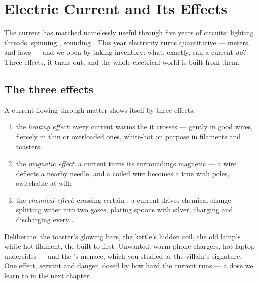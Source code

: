 \chapter{Electric Current and Its Effects}\label{ch:g8:electric-current-effects}

The current has marched namelessly useful through five years of
circuits: lighting threads, spinning , sounding .
This year electricity turns quantitative --- meters,  and
laws --- and we open by taking inventory: what, exactly, can a
current \emph{do}? Three effects, it turns out, and the whole
electrical world is built from them.

\section{The three effects}

\begin{proposition}\label{prop:g8:electric-current-effects:three}
A current flowing through matter shows itself by three effects:
\begin{enumerate}
  \item the \emph{heating effect}: every
        current warms the  it crosses --- gently in good
        wires, fiercely in thin or overloaded ones, white-hot on
        purpose in filaments and toasters;
  \item the \emph{magnetic effect}: a
        current turns its surroundings magnetic --- a wire
        deflects a nearby  needle, and a coiled wire
        becomes a true  with poles, switchable at will;
  \item the \emph{chemical effect}:
        crossing certain , a current drives chemical
        change --- splitting water into two gases, plating
        spoons with silver, charging and discharging every
        .
\end{enumerate}
\end{proposition}

\begin{example}\label{ex:g8:electric-current-effects:heating}
Deliberate: the toaster's glowing bars, the kettle's hidden
coil, the old lamp's white-hot filament, the  built to 
first. Unwanted: warm phone chargers, hot laptop undersides ---
and the 's menace, which you studied as the
villain's signature. One effect, servant and danger, dosed by
how hard the current runs --- a dose we learn to \emph{}
in the next chapter.
\end{example}

